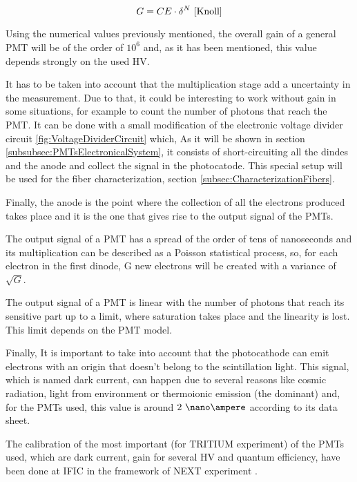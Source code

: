 \begin{itemize}
\begin{equation}
G = CE\cdot{} \delta^N~\cite{Knoll}
\label{eq:PMTGain}
\end{equation}

Using the numerical values previously mentioned, the overall gain of a general PMT will be of the order of $10^6$ and, as it has been mentioned, this value depends strongly on the used HV.

It has to be taken into account that the multiplication stage add a uncertainty in the measurement. Due to that, it could be interesting to work without gain in some situations, for example to count the number of photons that reach the PMT. It can be done with a small modification of the electronic voltage divider circuit \ref{fig:VoltageDividerCircuit} which, As it will be shown in section \ref{subsubsec:PMTsElectronicalSystem}, it consists of short-circuiting all the dindes and the anode and collect the signal in the photocatode. This special setup will be used for the fiber characterization, section \ref{subsec:CharacterizationFibers}.

Finally, the anode is the point where the collection of all the electrons produced takes place and it is the one that gives rise to the output signal of the PMTs.

\end{itemize}

The output signal of a PMT has a spread of the order of tens of nanoseconds and its multiplication can be described as a Poisson statistical process, so, for each electron in the first dinode, G new electrons will be created with a variance of $\sqrt{G}$.

The output signal of a PMT is linear with the number of photons that reach its sensitive part up to a limit, where saturation takes place and the linearity is lost. This limit depends on the PMT model.

Finally, It is important to take into account that the photocathode can emit electrons with an origin that doesn't belong to the scintillation light. This signal, which is named dark current, can  happen due to several reasons like cosmic radiation, light from environment or thermoionic emission (the dominant) and, for the PMTs used, this value is around $2~\nano\ampere$ according to its data sheet.

The calibration of the most important (for TRITIUM experiment) of the PMTs used, which are dark current, gain for several HV and quantum efficiency,  have been done at IFIC in the framework of NEXT experiment \cite{CalibrationPMTsNEXT}. 